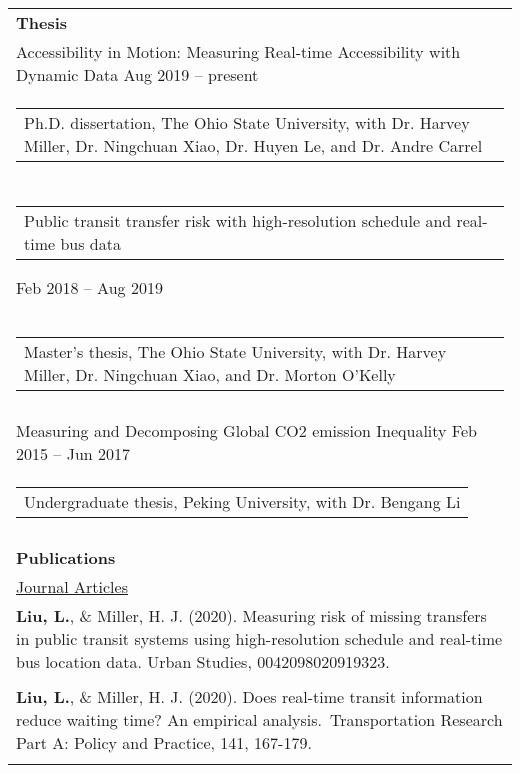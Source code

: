 \documentclass[letterpaper, 11pt]{article}
\begin{document}
\begin{longtable}{p{6.5in}}

{\textbf{Thesis}}\\

Accessibility in Motion: Measuring Real-time Accessibility with Dynamic Data \hfill Aug 2019 -- present \\ 
\begin{tabular}{p{5in}}
Ph.D. dissertation, The Ohio State University, with Dr. Harvey Miller, Dr. Ningchuan Xiao, Dr. Huyen Le, and Dr. Andre Carrel
\end{tabular} \\ \\

\begin{tabular}{p{5in}}
Public transit transfer risk with high-resolution schedule and real-time bus data 
\end{tabular} \hfill Feb 2018 -- Aug 2019 \\
\begin{tabular}{p{5in}}
Master's thesis, The Ohio State University, with Dr. Harvey Miller, Dr. Ningchuan Xiao, and Dr. Morton O'Kelly
\end{tabular} \\ \\


Measuring and Decomposing Global CO2 emission Inequality \hfill Feb 2015 -- Jun 2017 \\ 
\begin{tabular}{p{5in}}
Undergraduate thesis, Peking University, with Dr. Bengang Li
\end{tabular} \\ \\

\nohyphens{\textbf{Publications}} \\
\underline{Journal Articles} \\
\textbf{Liu, L.}, \& Miller, H. J. (2020). Measuring risk of missing transfers in public transit systems using high-resolution schedule and real-time bus location data. Urban Studies, 0042098020919323.\\\\

\textbf{Liu, L.}, \&  Miller, H. J. (2020). Does real-time transit information reduce waiting time? An empirical analysis. Transportation Research Part A: Policy and Practice, 141, 167-179.\\\\


\end{longtable}
\end{document}
